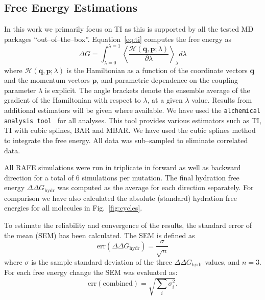 \documentclass[journal=jctcce,manuscript=article]{achemso}
\newcommand{\progname}[1]{\texttt{#1}}
\renewcommand{\vec}[1]{\mathbf{#1}}
\begin{document}
\newpage

\subsection{Free Energy Estimations}
\label{sec:analysis}

In this work we primarily focus on TI as this is supported by all the
tested MD packages ``out--of--the--box''. Equation~\ref{eq:ti}
computes the free energy as \begin{equation}\label{eq:ti}
  \Delta G = \int_{\lambda=0}^{\lambda=1}
  \left\langle
  \frac{\mathscr{H}(\vec{q},\vec{p};\lambda)}{\partial\lambda}\right\rangle_\lambda
  d\lambda
\end{equation}
where $\mathscr{H}(\vec{q},\vec{p};\lambda)$ is the Hamiltonian as a
function of the coordinate vectors $\vec{q}$ and the momentum vectors
$\vec{p}$, and parametric dependence on the coupling parameter
$\lambda$ is explicit.  The angle brackets denote the ensemble average
of the gradient of the Hamiltonian with respect to $\lambda$, at a
given $\lambda$ value.  Results from additional
estimators will be given where available.  We have used the
\progname{alchemical analysis tool}~\cite{klimovich_guidelines_2015}
for all analyses.  This tool provides various estimators such as TI,
TI with cubic splines, BAR and MBAR.  We have used the cubic splines
method to integrate the free energy.  All data was sub--sampled to
eliminate correlated data.

All RAFE simulations were run in triplicate in forward as well as
backward direction for a total of 6 simulations per mutation.  The
final hydration free energy $\Delta\Delta G_{\mathrm{hydr}}$ was
computed as the average for each direction separately.  For comparison we have also calculated the absolute (standard) hydration free energies for all molecules in Fig.~\ref{fig:cycles}.

To estimate the reliability and convergence of the results, the
standard error of the mean (SEM) has been calculated.  The SEM is
defined as
\begin{equation}
  \label{eq:sem}
  \mathrm{err}(\Delta\Delta G_{\mathrm{hydr}}) = \frac{\sigma}{\sqrt{n}}
\end{equation}
where $\sigma$ is the sample standard deviation of the three $\Delta \Delta G_{\mathrm{hydr}}$ values, and $n=3$.
For each free energy change the SEM was evaluated as:
\begin{equation}
  \label{eq:sem-comb}
  \mathrm{err}(\mathrm{combined}) = \sqrt{\sum_i \sigma_i^2}.
\end{equation}
\end{document}
